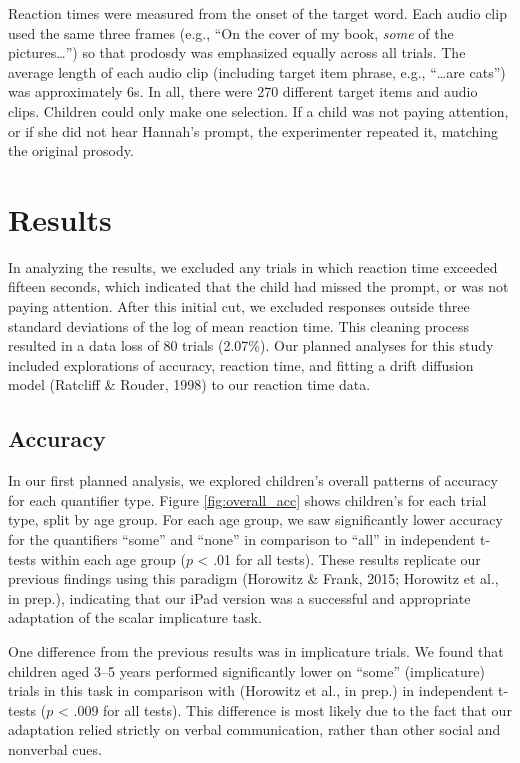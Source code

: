 \documentclass[10pt, letterpaper]{article}
\begin{document}
Reaction times were measured from the onset of the target word. Each
audio clip used the same three frames (e.g., ``On the cover of my book,
\emph{some} of the pictures\ldots{}'') so that prodosdy was emphasized
equally across all trials. The average length of each audio clip
(including target item phrase, e.g., ``\ldots{}are cats'') was
approximately 6s. In all, there were 270 different target items and
audio clips. Children could only make one selection. If a child was not
paying attention, or if she did not hear Hannah's prompt, the
experimenter repeated it, matching the original prosody.

\section{Results}\label{results}

In analyzing the results, we excluded any trials in which reaction time
exceeded fifteen seconds, which indicated that the child had missed the
prompt, or was not paying attention. After this initial cut, we excluded
responses outside three standard deviations of the log of mean reaction
time. This cleaning process resulted in a data loss of 80 trials
(2.07\%). Our planned analyses for this study included explorations of
accuracy, reaction time, and fitting a drift diffusion model (Ratcliff
\& Rouder, 1998) to our reaction time data.

\subsection{Accuracy}\label{accuracy}

In our first planned analysis, we explored children's overall patterns
of accuracy for each quantifier type. Figure \ref{fig:overall_acc} shows
children's for each trial type, split by age group. For each age group,
we saw significantly lower accuracy for the quantifiers ``some'' and
``none'' in comparison to ``all'' in independent t-tests within each age
group (\(p\) \textless{} .01 for all tests). These results replicate our
previous findings using this paradigm (Horowitz \& Frank, 2015; Horowitz
et al., in prep.), indicating that our iPad version was a successful and
appropriate adaptation of the scalar implicature task.

One difference from the previous results was in implicature trials. We
found that children aged 3--5 years performed significantly lower on
``some'' (implicature) trials in this task in comparison with (Horowitz
et al., in prep.) in independent t-tests (\(p\) \textless{} .009 for all
tests). This difference is most likely due to the fact that our
adaptation relied strictly on verbal communication, rather than other
social and nonverbal cues.
\end{document}

